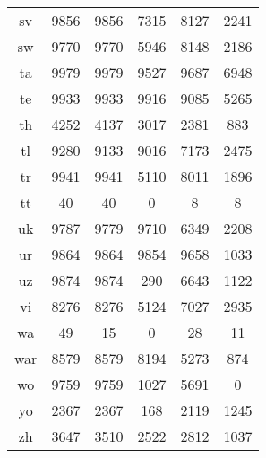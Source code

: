 \begin{figure}[h]
\begin{tabular}{cccccc}
sv&9856&9856&7315&8127&2241\\
sw&9770&9770&5946&8148&2186\\
ta&9979&9979&9527&9687&6948\\
te&9933&9933&9916&9085&5265\\
th&4252&4137&3017&2381&883\\
tl&9280&9133&9016&7173&2475\\
tr&9941&9941&5110&8011&1896\\
tt&40&40&0&8&8\\
uk&9787&9779&9710&6349&2208\\
ur&9864&9864&9854&9658&1033\\
uz&9874&9874&290&6643&1122\\
vi&8276&8276&5124&7027&2935\\
wa&49&15&0&28&11\\
war&8579&8579&8194&5273&874\\
wo&9759&9759&1027&5691&0\\
yo&2367&2367&168&2119&1245\\
zh&3647&3510&2522&2812&1037\\
\hline\hline
\end{tabular}
\end{figure}
